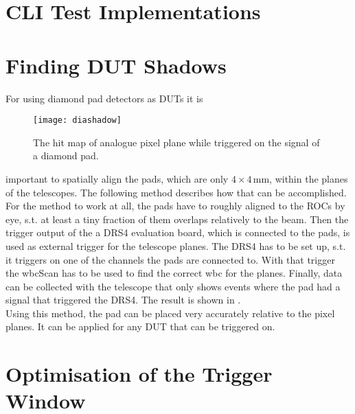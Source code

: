 \section{\ac{CLI} Test Implementations}
\section{Finding \ac{DUT} Shadows}
For using diamond pad detectors as \ac{DUT}s it is
\begin{wrapfigure}{r}{5cm}
	\vspace*{-10pt}
	\texttt{[image: diashadow]}
	\caption{The hit map of analogue pixel plane while triggered on the signal of a diamond pad.}
	\label{pdiashodow}
	\vspace*{-5pt}
\end{wrapfigure} 
important to spatially align the pads, which are only $4\times4\,$mm, within the planes of the telescopes. The following method describes how that can be accomplished.\\
For the method to work at all, the pads have to roughly aligned to the \ac{ROC}s by eye, s.t. at least a tiny fraction of them overlaps relatively to the beam. Then the trigger output of the a DRS4 evaluation board, which is connected to the pads, is used as external trigger for the telescope planes. The DRS4 has to be set up, s.t. it triggers on one of the channels the pads are connected to. With that trigger the wbcScan has to be used to find the correct wbc for the planes. Finally, data can be collected with the telescope that only shows events where the pad had a signal that triggered the DRS4. The result is shown in .\\
Using this method, the pad can be placed very accurately relative to the pixel planes. It can be applied for any \ac{DUT} that can be triggered on.
\section{Optimisation of the Trigger Window}
